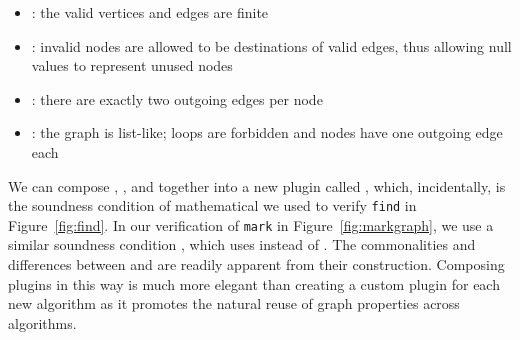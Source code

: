 \begin{itemize}
\vspace{-1ex}
\item {}: the valid vertices and edges are finite
\item {}: invalid nodes are allowed to be destinations
of valid edges, thus allowing null values to represent unused nodes
\item {}: there are exactly two outgoing edges per node
\item {}: the graph is list-like; loops are forbidden and 
nodes have one outgoing edge each
\end{itemize}

We can compose 
, , and  
together into a new plugin called , which, incidentally, is
the soundness condition of mathematical  
we used to verify \texttt{find} in
Figure~\ref{fig:find}.  In our verification of \texttt{mark} in
Figure~\ref{fig:markgraph}, we use a similar soundness condition
, which uses  instead of . 
The commonalities and differences between  
and  are readily apparent from their construction.
Composing plugins in this way is much more elegant than creating a
custom plugin for each new algorithm as it promotes the natural reuse of graph 
properties across algorithms.

\iffalse
\marginpar{\tiny \color{blue} Maybe move this somewhere.} 
{\color{magenta}Coq also handles our notion of inherited 
lemmas seamlessly: in our verfication of Find, we 
work directly with a \p{LiMaFin} GeneralGraph, but, as 
we saw, we still use properties such as reachability 
and operations such as selective subtraction, which are defined on the 
embedded PreGraph, not the GeneralGraph. 
Coq handles the appropriate coercions with 
remarkable elegance.}
\fi

